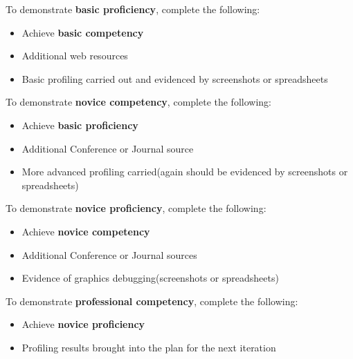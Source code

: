 \documentclass{../../../fal_assignment}
\begin{document}
To demonstrate \textbf{basic proficiency}, complete the following:
\begin{itemize}
	\item Achieve \textbf{basic competency}
	\item Additional web resources
	\item Basic profiling carried out and evidenced by screenshots or spreadsheets
\end{itemize}

To demonstrate \textbf{novice competency}, complete the following:
\begin{itemize}
	\item Achieve \textbf{basic proficiency}
	\item Additional Conference or Journal source
	\item More advanced profiling carried(again should be evidenced by screenshots or spreadsheets)
\end{itemize}

To demonstrate \textbf{novice proficiency}, complete the following:
\begin{itemize}
	\item Achieve \textbf{novice competency}
	\item Additional Conference or Journal sources
	\item Evidence of graphics debugging(screenshots or spreadsheets)
\end{itemize}

To demonstrate \textbf{professional competency}, complete the following:
\begin{itemize}
	\item Achieve \textbf{novice proficiency}
	\item Profiling results brought into the plan for the next iteration
\end{itemize}
\end{document}
